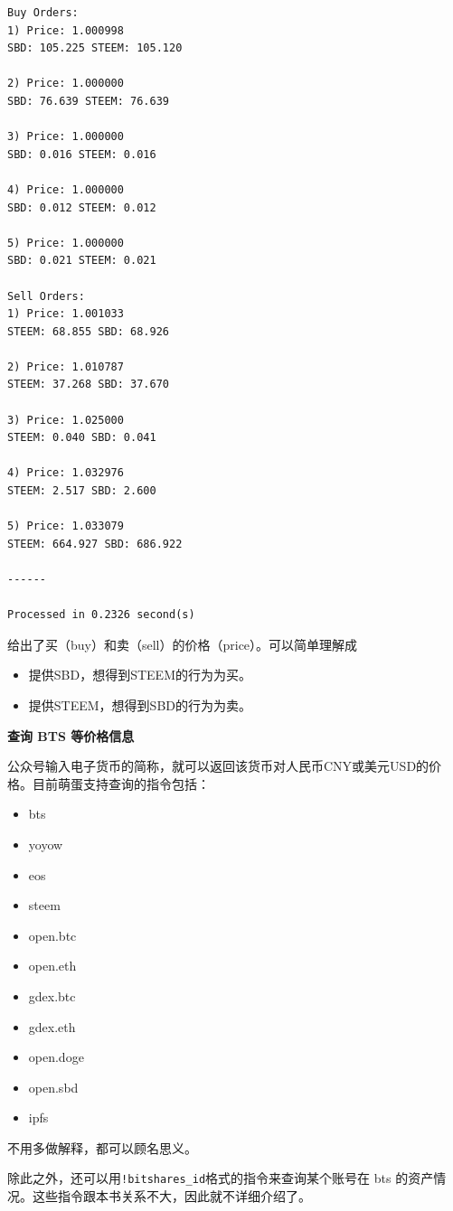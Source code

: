 \documentclass[]{ctexbook}
\begin{document}
\begin{verbatim}
Buy Orders:
1) Price: 1.000998
SBD: 105.225 STEEM: 105.120

2) Price: 1.000000
SBD: 76.639 STEEM: 76.639

3) Price: 1.000000
SBD: 0.016 STEEM: 0.016

4) Price: 1.000000
SBD: 0.012 STEEM: 0.012

5) Price: 1.000000
SBD: 0.021 STEEM: 0.021

Sell Orders:
1) Price: 1.001033
STEEM: 68.855 SBD: 68.926

2) Price: 1.010787
STEEM: 37.268 SBD: 37.670

3) Price: 1.025000
STEEM: 0.040 SBD: 0.041

4) Price: 1.032976
STEEM: 2.517 SBD: 2.600

5) Price: 1.033079
STEEM: 664.927 SBD: 686.922

------

Processed in 0.2326 second(s)
\end{verbatim}

给出了买（buy）和卖（sell）的价格（price）。可以简单理解成

\begin{itemize}
\item
  提供SBD，想得到STEEM的行为为买。
\item
  提供STEEM，想得到SBD的行为为卖。
\end{itemize}

\textbf{查询 BTS 等价格信息}

公众号输入电子货币的简称，就可以返回该货币对人民币CNY或美元USD的价格。目前萌蛋支持查询的指令包括：

\begin{itemize}
\item
  bts
\item
  yoyow
\item
  eos
\item
  steem
\item
  open.btc
\item
  open.eth
\item
  gdex.btc
\item
  gdex.eth
\item
  open.doge
\item
  open.sbd
\item
  ipfs
\end{itemize}

不用多做解释，都可以顾名思义。

除此之外，还可以用\texttt{!bitshares\_id}格式的指令来查询某个账号在 bts 的资产情况。这些指令跟本书关系不大，因此就不详细介绍了。
\end{document}
